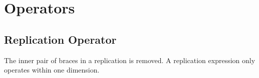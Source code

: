 \chapter{Operators}

\section{Replication Operator}
 The inner pair of braces in a replication is
removed. A replication expression only operates within one dimension.
